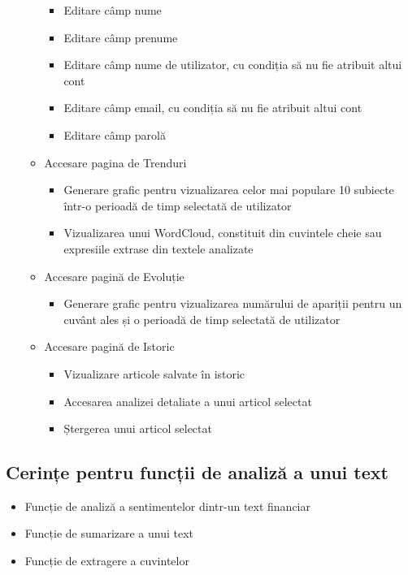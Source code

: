 \begin{itemize}
\begin{itemize}
        \begin{itemize}
            \setlength\itemsep{0.5em}
            \item Editare câmp nume
            \item Editare câmp prenume
            \item Editare câmp nume de utilizator, cu condiția să nu fie atribuit altui cont
            \item Editare câmp email, cu condiția să nu fie atribuit altui cont
            \item Editare câmp parolă
        \end{itemize}
        \item Accesare pagina de Trenduri
        \begin{itemize}
            \setlength\itemsep{0.5em}
            \item Generare grafic pentru vizualizarea celor mai populare 10 subiecte într-o perioadă de timp selectată de utilizator
            \item Vizualizarea unui WordCloud, constituit din cuvintele cheie sau expresiile extrase din textele analizate
        \end{itemize}
        \item Accesare pagină de Evoluție
        \begin{itemize}
            \setlength\itemsep{0.5em}
            \item Generare grafic pentru vizualizarea numărului de apariții pentru un cuvânt ales și o perioadă de timp selectată de utilizator
        \end{itemize}
        \item Accesare pagină de Istoric
        \begin{itemize}
            \setlength\itemsep{0.5em}
            \item Vizualizare articole salvate în istoric
            \item Accesarea analizei detaliate a unui articol selectat
            \item Ștergerea unui articol selectat
        \end{itemize}
    \end{itemize}
\end{itemize}
\newpage

\subsection{Cerințe pentru funcții de analiză a unui text}
\begin{itemize}
    \setlength\itemsep{0.5em}
    \item Funcție de analiză a sentimentelor dintr-un text financiar
    \item Funcție de sumarizare a unui text
    \item Funcție de extragere a cuvintelor
\end{itemize}
